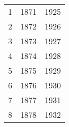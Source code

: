 % 
\begin{tabular}{ccc}
  \hline
  \hline
1 & 1871 & 1925 \\ 
  2 & 1872 & 1926 \\ 
  3 & 1873 & 1927 \\ 
  4 & 1874 & 1928 \\ 
  5 & 1875 & 1929 \\ 
  6 & 1876 & 1930 \\ 
  7 & 1877 & 1931 \\ 
  8 & 1878 & 1932 \\ 
   \hline
\end{tabular}

